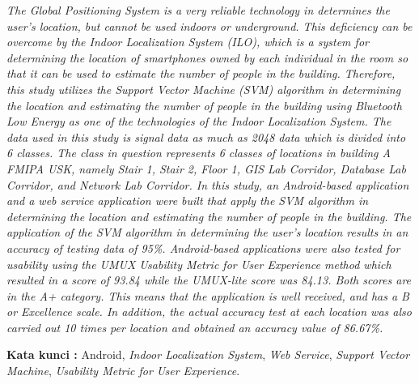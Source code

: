 \begin{abstracteng}

    \textit{The Global Positioning System is a very reliable technology in
        determines the user's location, but cannot be used indoors or underground. This deficiency can be overcome by the Indoor Localization System (ILO), which is a system for determining the location of smartphones owned by each individual in the room so that it can be used to estimate the number of people in the building. Therefore, this study utilizes the Support Vector Machine (SVM) algorithm in determining the location and estimating the number of people in the building using Bluetooth Low Energy as one of the technologies of the Indoor Localization System. The data used in this study is signal data as much as 2048 data which is divided into 6 classes. The class in question represents 6 classes of locations in building A FMIPA USK, namely Stair 1, Stair 2, Floor 1, GIS Lab Corridor, Database Lab Corridor, and Network Lab Corridor. In this study, an Android-based application and a web service application were built that apply the SVM algorithm in determining the location and estimating the number of people in the building. The application of the SVM algorithm in determining the user's location results in an accuracy of testing data of 95\%. Android-based applications were also tested for usability using the UMUX Usability Metric for User Experience method which resulted in a score of 93.84 while the UMUX-lite score was 84.13. Both scores are in the A+ category. This means that the application is well received, and has a B or Excellence scale. In addition, the actual accuracy test at each location was also carried out 10 times per location and obtained an accuracy value of 86.67\%.}


    \bigskip
    \noindent
    \textbf{Kata kunci :} Android, \textit{Indoor Localization System}, \textit{Web Service}, \textit{Support Vector Machine}, \textit{Usability Metric for User Experience}.
\end{abstracteng}